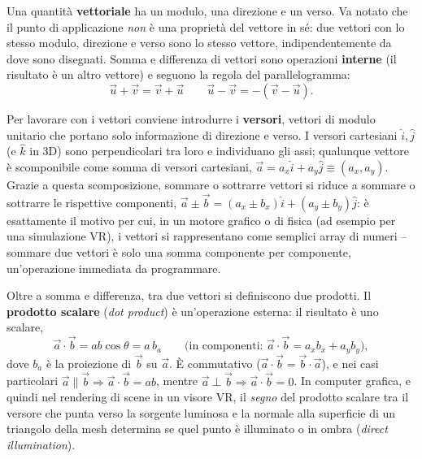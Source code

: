 \documentclass[a4paper,11pt]{article}
\begin{document}
Una quantità \textbf{vettoriale} ha un modulo, una direzione e un verso. Va notato che il punto di applicazione \emph{non} è una proprietà del vettore in sé: due vettori con lo stesso modulo, direzione e verso sono lo stesso vettore, indipendentemente da dove sono disegnati. Somma e differenza di vettori sono operazioni \textbf{interne} (il risultato è un altro vettore) e seguono la regola del parallelogramma:
\[
\vec{u}+\vec{v} = \vec{v}+\vec{u} \qquad \vec{u}-\vec{v} = -(\vec{v}-\vec{u}).
\]

\begin{center}
\end{center}

Per lavorare con i vettori conviene introdurre i \textbf{versori}, vettori di modulo unitario che portano solo informazione di direzione e verso. I versori cartesiani $\hat{i},\hat{j}$ (e $\hat{k}$ in 3D) sono perpendicolari tra loro e individuano gli assi; qualunque vettore è scomponibile come somma di versori cartesiani, $\vec{a}=a_x\hat{i}+a_y\hat{j}\equiv(a_x,a_y)$. Grazie a questa scomposizione, sommare o sottrarre vettori si riduce a sommare o sottrarre le rispettive componenti, $\vec{a}\pm\vec{b}=(a_x\pm b_x)\hat{i}+(a_y\pm b_y)\hat{j}$: è esattamente il motivo per cui, in un motore grafico o di fisica (ad esempio per una simulazione VR), i vettori si rappresentano come semplici array di numeri -- sommare due vettori è solo una somma componente per componente, un'operazione immediata da programmare.

Oltre a somma e differenza, tra due vettori si definiscono due prodotti. Il \textbf{prodotto scalare} (\emph{dot product}) è un'operazione esterna: il risultato è uno scalare,
\[
\vec{a}\cdot\vec{b} = ab\cos\theta = a\,b_a \qquad \text{(in componenti: } \vec{a}\cdot\vec{b} = a_xb_x + a_yb_y\text{)},
\]
dove $b_a$ è la proiezione di $\vec b$ su $\vec a$. È commutativo ($\vec a\cdot\vec b=\vec b\cdot\vec a$), e nei casi particolari $\vec a\parallel\vec b \Rightarrow \vec a\cdot\vec b=ab$, mentre $\vec a\perp\vec b \Rightarrow \vec a\cdot\vec b=0$. In computer grafica, e quindi nel rendering di scene in un visore VR, il \emph{segno} del prodotto scalare tra il versore che punta verso la sorgente luminosa e la normale alla superficie di un triangolo della mesh determina se quel punto è illuminato o in ombra (\emph{direct illumination}).
\end{document}

